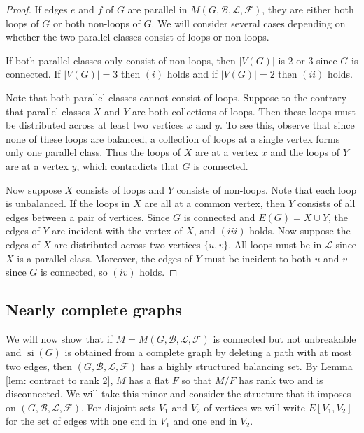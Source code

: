 \documentclass[12pt]{article}
\theoremstyle{definition}
\theoremstyle{plain} %
\newcommand{\cB}{\mathcal{B}}
\newcommand{\cF}{\mathcal{F}}
\newcommand{\cL}{\mathcal{L}}
\DeclareMathOperator{\si}{si}
\begin{document}
\begin{proof}
    If edges $e$ and $f$ of $G$ are parallel in $M(G, \cB, \cL, \cF)$, they are either both loops of $G$ or both non-loops of $G$. We will consider several cases depending on whether the two parallel classes consist of loops or non-loops. 
    
    If both parallel classes only consist of non-loops, then $|V(G)|$ is $2$ or $3$ since $G$ is connected. If $|V(G)|=3$ then $(i)$ holds and if $|V(G)|=2$ then $(ii)$ holds.

    Note that both parallel classes cannot consist of loops. Suppose to the contrary that parallel classes $X$ and $Y$ are both collections of loops. Then these loops must be distributed across at least two vertices $x$ and $y$. To see this, observe that since none of these loops are balanced, a collection of loops at a single vertex forms only one parallel class. Thus the loops of $X$ are at a vertex $x$ and the loops of $Y$ are at a vertex $y$, which contradicts that $G$ is connected.

    Now suppose $X$ consists of loops and $Y$ consists of non-loops. Note that each loop is unbalanced. If the loops in $X$ are all at a common vertex, then $Y$ consists of all edges between a pair of vertices. Since $G$ is connected and $E(G)=X\cup Y$, the edges of $Y$ are incident with the vertex of $X$, and $(iii)$ holds. Now suppose the edges of $X$ are distributed across two vertices $\{u,v\}$. All loops must be in $\cL$ since $X$ is a parallel class. Moreover, the edges of $Y$ must be incident to both $u$ and $v$ since $G$ is connected, so $(iv)$ holds.
\end{proof}



\subsection{Nearly complete graphs}\label{sec: nearly complete graphs}

We will now show that if $M = M(G, \cB, \cL, \cF)$ is connected but not unbreakable and $\si(G)$ is obtained from a complete graph by deleting a path with at most two edges, then $(G, \cB, \cL, \cF)$ has a highly structured balancing set. 
By Lemma \ref{lem: contract to rank 2}, $M$ has a flat $F$ so that $M/F$ has rank two and is disconnected.
We will take this minor and consider the structure that it imposes on $(G, \cB, \cL, \cF)$.
For disjoint sets $V_1$ and $V_2$ of vertices we will write $E[V_1, V_2]$ for the set of edges with one end in $V_1$ and one end in $V_2$.
\end{document}
